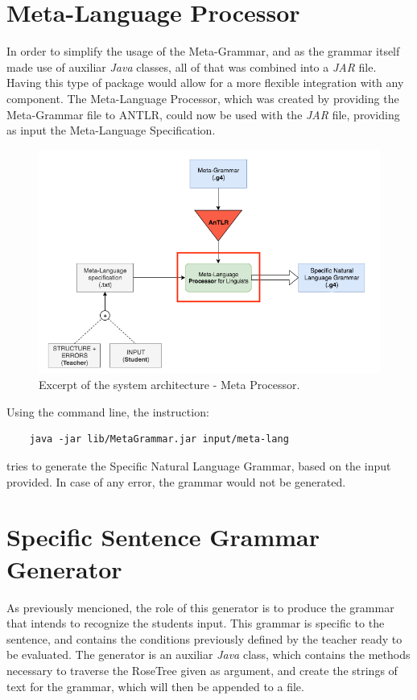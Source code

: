 \section{Meta-Language Processor}

In order to simplify the usage of the Meta-Grammar, and as the grammar itself made use of auxiliar \emph{Java} classes, all of that was combined into a \emph{JAR} file.
Having this type of package would allow for a more flexible integration with any component.
The Meta-Language Processor, which was created by providing the Meta-Grammar file to ANTLR, could now be used with the \emph{JAR} file, 
providing as input the Meta-Language Specification. 

\begin{figure}[h]
    \centering
    \includegraphics[width=12cm]{images/system_meta_processor.png}
    \caption{Excerpt of the system architecture - Meta Processor.}
    \label{fig:system_architecture}
\end{figure}

\newpage
\noindent Using the command line, the instruction:
\begin{Verbatim}
	java -jar lib/MetaGrammar.jar input/meta-lang
\end{Verbatim}
\noindent tries to generate the Specific Natural Language Grammar, based on the input provided. In case of any error, the grammar would not be generated.


\section{Specific Sentence Grammar Generator}

As previously mencioned, the role of this generator is to produce the grammar that intends to recognize the students input.
This grammar is specific to the sentence, and contains the conditions previously defined by the teacher ready to be evaluated.
The generator is an auxiliar \emph{Java} class, which contains the methods necessary to traverse the RoseTree given as argument,
and create the strings of text for the grammar, which will then be appended to a file.


